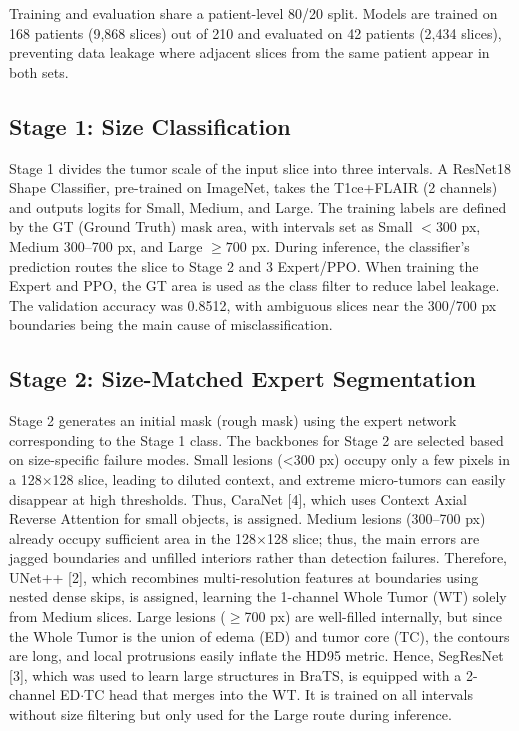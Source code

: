 \documentclass[11pt,a4paper]{article}
\begin{document}
Training and evaluation share a patient-level 80/20 split. Models are trained on 168 patients (9,868 slices) out of 210 and evaluated on 42 patients (2,434 slices), preventing data leakage where adjacent slices from the same patient appear in both sets.

\subsection{Stage 1: Size Classification}
Stage 1 divides the tumor scale of the input slice into three intervals. A ResNet18 Shape Classifier, pre-trained on ImageNet, takes the T1ce+FLAIR (2 channels) and outputs logits for Small, Medium, and Large. The training labels are defined by the GT (Ground Truth) mask area, with intervals set as Small $<300$ px, Medium 300--700 px, and Large $\ge 700$ px. During inference, the classifier's prediction routes the slice to Stage 2 and 3 Expert/PPO. When training the Expert and PPO, the GT area is used as the class filter to reduce label leakage. The validation accuracy was 0.8512, with ambiguous slices near the 300/700 px boundaries being the main cause of misclassification.

\subsection{Stage 2: Size-Matched Expert Segmentation}
Stage 2 generates an initial mask (rough mask) using the expert network corresponding to the Stage 1 class. The backbones for Stage 2 are selected based on size-specific failure modes. Small lesions (<300 px) occupy only a few pixels in a 128$\times$128 slice, leading to diluted context, and extreme micro-tumors can easily disappear at high thresholds. Thus, CaraNet [4], which uses Context Axial Reverse Attention for small objects, is assigned. Medium lesions (300--700 px) already occupy sufficient area in the 128$\times$128 slice; thus, the main errors are jagged boundaries and unfilled interiors rather than detection failures. Therefore, UNet++ [2], which recombines multi-resolution features at boundaries using nested dense skips, is assigned, learning the 1-channel Whole Tumor (WT) solely from Medium slices. Large lesions ($\ge$700 px) are well-filled internally, but since the Whole Tumor is the union of edema (ED) and tumor core (TC), the contours are long, and local protrusions easily inflate the HD95 metric. Hence, SegResNet [3], which was used to learn large structures in BraTS, is equipped with a 2-channel ED$\cdot$TC head that merges into the WT. It is trained on all intervals without size filtering but only used for the Large route during inference.
\end{document}
